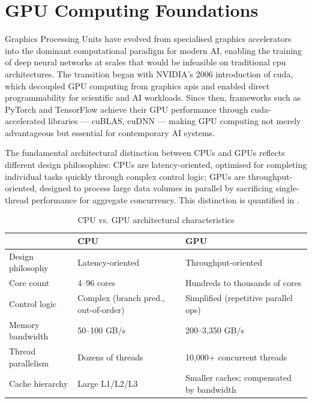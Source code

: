 
\section{GPU Computing Foundations}
\label{sec:gpu-foundations}

Graphics Processing Units have evolved from specialised graphics accelerators
into the dominant computational paradigm for modern AI, enabling the training
of deep neural networks at scales that would be infeasible on traditional
\acrshort{cpu} architectures. The transition began with NVIDIA's 2006
introduction of \acrshort{cuda}, which decoupled GPU computing from graphics
\acrshort{api}s and enabled direct programmability for scientific and AI
workloads. Since then, frameworks such as PyTorch and TensorFlow achieve their
GPU performance through \acrshort{cuda}-accelerated libraries — cuBLAS, cuDNN
— making GPU computing not merely advantageous but essential for contemporary
AI systems.

The fundamental architectural distinction between CPUs and GPUs reflects
different design philosophies: CPUs are latency-oriented, optimised for
completing individual tasks quickly through complex control logic; GPUs are
throughput-oriented, designed to process large data volumes in parallel by
sacrificing single-thread performance for aggregate concurrency. This
distinction is quantified in .

\begin{table}[htbp]
  \centering
  \caption{CPU vs. GPU architectural characteristics}
  \label{tab:cpu-vs-gpu}
  \begin{tabularx}{\textwidth}{lXX}
    \toprule
    \tableheader{Feature & CPU & GPU} \\
    \midrule
    Design philosophy  & Latency-oriented      & Throughput-oriented \\
    \rowcolor{TableRowOdd}
    Core count         & 4–96 cores            & Hundreds to thousands of cores \\
    Control logic      & Complex (branch pred., out-of-order) & Simplified (repetitive parallel ops) \\
    \rowcolor{TableRowOdd}
    Memory bandwidth   & 50–100 GB/s           & 200–3,350 GB/s \\
    Thread parallelism & Dozens of threads     & 10,000+ concurrent threads \\
    \rowcolor{TableRowOdd}
    Cache hierarchy    & Large L1/L2/L3        & Smaller caches; compensated by bandwidth \\
    \bottomrule
  \end{tabularx}
\end{table}

